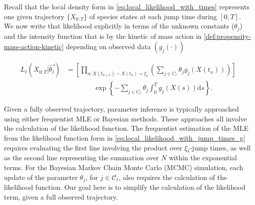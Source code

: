 \documentclass[pdflatex,sn-mathphys-num]{sn-jnl}%
\def\dd{\text{d}}
\theoremstyle{thmstyleone}%
\theoremstyle{thmstyletwo}%
\theoremstyle{thmstylethree}%
\begin{document}
Recall that the local density form in \eqref{eq:local_likelihood_with_times} represents one given trajectory $\{X_{0:T}\}$ of species states at each jump time during $[0,T]$. We now write that likelihood explicitly in terms of the unknown constants ($\theta_{j}$) and the intensity function that is by the kinetic of mass action in \eqref{def:propensity-mass-action-kinetic} depending on  observed data $(g_{j}(\cdot))$  

\begin{equation}
\begin{aligned}
L_\ell\left(X_{0:T}\big|\overrightarrow{\theta_\ell}\right) 
    &=\left[\prod_{n: X(t_{n+1})-X(t_n) = \xi_\ell}
    \left( \sum_{j \in C_\ell} \theta_{j} g_{j}\left( X(t_n)\right) \right)\right] \\
    & \quad\quad\quad\quad 
    \exp\left\{
        -\sum_{j \in C_\ell} \theta_{j} \int_0^T   g_{j}\left( X(s)\right) \dd s
    \right\} .
\end{aligned}
\label{eq:local_likelihood_with_jump_times_g}
\end{equation}

Given a fully observed trajectory, parameter inference is typically approached using either frequentist MLE or Bayesian methods. These approaches all involve the calculation of the likelihood function. The frequentist estimation of the MLE from the likelihood function form in \eqref{eq:local_likelihood_with_jump_times_g} requires evaluating the first line involving the product over $\xi_\ell$-jump times, as well as the second line representing the summation over $N$ within the exponential terms. For the Bayesian Markov Chain Monte Carlo (MCMC) simulation, each update of the parameter $\theta_{j}$, for $j\in \mathcal{C}_\ell$, also requires the calculation of the likelihood function. Our goal here is to simplify the calculation of the likelihood term, given a full observed trajectory.  
\end{document}
